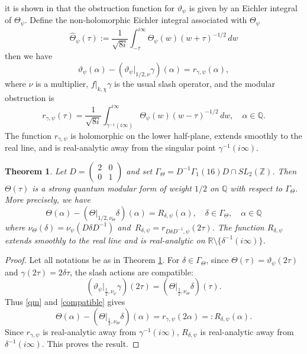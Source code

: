 \documentclass[10pt,a4paper]{amsart}
\newtheorem{theorem}    {Theorem}
\numberwithin{equation}{section}
\begin{document}
it is shown in \cite{Goswami-Osburn} that the obstruction function for
\(\vartheta_{\psi}\) is given by an Eichler integral of \(\Theta_{\psi}\). Define the non-holomorphic Eichler integral associated with
\(\Theta_{\psi}\)
\[
\widehat{\Theta}_{\psi}(\tau)
:=
\frac{1}{\sqrt{8i}}
\int_{-\overline{\tau}}^{i\infty}
\Theta_{\psi}(w)(w+\tau)^{-1/2}\,dw
\]
then we have
\begin{equation}\label{qm}
\vartheta_{\psi}(\alpha)
-
\left(\vartheta_{\psi}|_{1/2,\nu}\gamma\right)(\alpha)
=
r_{\gamma,\psi}(\alpha),
\end{equation}
where $\nu$ is a multiplier, $f|_{k,\chi}\gamma$ is the usual slash operator, and 
the modular obstruction is
\begin{equation}\label{eq:quantum-cocycle}
r_{\gamma,\psi}(\tau)
=
\frac{1}{\sqrt{8i}}
\int_{\gamma^{-1}(i\infty)}^{i\infty}
\Theta_{\psi}(w)(w-\tau)^{-1/2}\,dw,\quad \alpha\in\mathbb{Q}.
\end{equation}
The function \(r_{\gamma,\psi}\) is holomorphic on the lower half-plane,
extends smoothly to the real line, and is real-analytic away from the singular
point \(\gamma^{-1}(i\infty)\). 
\begin{theorem}\label{thm:quantum-modularity}
Let $D=\begin{pmatrix}2&0\\0&1\end{pmatrix}$ and set $\Gamma_\Theta=
D^{-1}\Gamma_1(16)D\cap SL_2(\mathbb Z)$. Then \(\Theta(\tau)\) is a strong
quantum modular form of weight \(1/2\) on \(\mathbb Q\) with respect to
\(\Gamma_\Theta\). More precisely, we have 
\begin{equation*}
\Theta(\alpha)-(\Theta|_{1/2,\nu_\Theta}\delta)(\alpha)=R_{\delta,\psi}(\alpha),\quad \delta\in\Gamma_\Theta,\quad\alpha\in\mathbb{Q}    
\end{equation*}
where $\nu_\Theta(\delta)=\nu_\psi(D\delta D^{-1})$ and $\,R_{\delta,\psi}=r_{D\delta D^{-1},\psi}(2\tau)$. The function \(R_{\delta,\psi}\) extends smoothly to the real line and is
real-analytic on $\mathbb R\setminus\{\delta^{-1}(i\infty)\}$.
\end{theorem}
\begin{proof}
Let all notations be as in Theorem \ref{thm:quantum-modularity}. For \(\delta\in\Gamma_{\Theta}\), since \(\Theta(\tau)=\vartheta_{\psi}(2\tau)\) and $\gamma(2\tau)=2\delta\tau$, the slash actions are compatible:
\begin{equation}\label{compatible}
\left(\vartheta_{\psi}\big|_{\frac12,\nu_{\psi}}\gamma\right)(2\tau)
=
\left(\Theta\big|_{\frac12,\nu_{\Theta}}\delta\right)(\tau).    
\end{equation}
Thus \eqref{qm} and \eqref{compatible} gives
\[
\Theta(\alpha)
-
\left(\Theta\big|_{\frac12,\nu_{\Theta}}\delta\right)(\alpha)
=
r_{\gamma,\psi}(2\alpha)=:R_{\delta,\psi}(\alpha).
\]
Since \(r_{\gamma,\psi}\) is real-analytic away from \(\gamma^{-1}(i\infty)\),
\(R_{\delta,\psi}\) is real-analytic away from \(\delta^{-1}(i\infty)\).  This
proves the result.
\end{proof}
\end{document}
